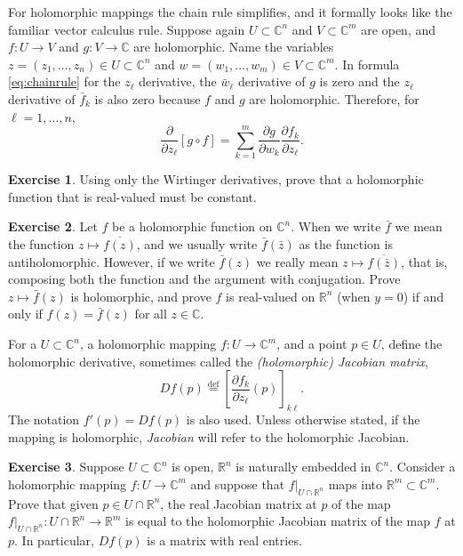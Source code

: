 \documentclass[12pt,openany]{book}
\newcommand{\C}{{\mathbb{C}}}
\newcommand{\R}{{\mathbb{R}}}
\newcommand{\myindex}[1]{#1\index{#1}}
\theoremstyle{plain}
\theoremstyle{remark}
\theoremstyle{definition}
\newenvironment{exbox}{%
    \def\FrameCommand{\vrule width 1pt \relax\hspace{10pt}}%
    \MakeFramed{\advance\hsize-\width\FrameRestore}%
}{%
    \endMakeFramed
}
\theoremstyle{exercise}
\newtheorem{exercise}{Exercise}[section]
\theoremstyle{example}
\begin{document}
For holomorphic mappings the chain rule simplifies, and it formally looks
like the familiar vector calculus rule.
Suppose again
$U \subset \C^n$ and $V \subset \C^m$ are open, and
$f \colon U \to V$ and $g \colon V \to \C$ are holomorphic.
Name the variables
$z = (z_1,\ldots,z_n) \in U \subset \C^n$ and $w = (w_1,\ldots,w_m) \in V
\subset \C^m$.  In formula \eqref{eq:chainrule} for the $z_\ell$ derivative,
the $\bar{w}_\ell$ derivative of $g$ is zero and the $z_\ell$ derivative of
$\bar{f}_k$ is also zero because $f$ and $g$ are holomorphic.
Therefore, for $\ell=1,\ldots,n$,
\begin{equation*}
\frac{\partial}{\partial z_\ell} \left[ g \circ f \right]
=
\sum_{k=1}^m
\frac{\partial g}{\partial w_k}
\frac{\partial f_k}{\partial z_\ell} .
\end{equation*}

\begin{exbox}
\begin{exercise}
Using only the Wirtinger derivatives, prove that a holomorphic function
that is real-valued must be constant.
\end{exercise}

\begin{exercise}
Let $f$ be a holomorphic function on $\C^n$.
When we write $\bar{f}$ we mean the function $z \mapsto \overline{f(z)}$,
and we usually write $\bar{f}(\bar{z})$ as the function is antiholomorphic.
However,
if we write $\bar{f}(z)$ we really mean $z \mapsto \overline{f(\bar{z})}$,
that is, composing both the function and the argument with conjugation.
Prove $z \mapsto \bar{f}(z)$ is holomorphic, and prove $f$ is
real-valued on $\R^n$ (when $y=0$) if and only if $f(z) =
\bar{f}(z)$ for all $z \in \C$.
\end{exercise}
\end{exbox}

For a $U \subset \C^n$, a holomorphic mapping $f \colon U \to \C^m$,
and a point $p \in U$,
define the holomorphic derivative, sometimes called the
\emph{(holomorphic) \myindex{Jacobian matrix}},
%
\begin{equation*}
Df(p)
\overset{\text{def}}{=}
\left[
\frac{\partial f_k}{\partial z_\ell} (p)
\right]_{k \ell} .
\end{equation*}
The notation $f'(p) = Df(p)$ is also used.
Unless otherwise stated, if the mapping is holomorphic,
\emph{Jacobian} will refer to the holomorphic Jacobian.

\begin{exbox}
\begin{exercise}
Suppose $U \subset \C^n$ is open, $\R^n$ is naturally embedded in $\C^n$.
Consider a holomorphic mapping $f \colon U \to \C^m$ and suppose that
$f|_{U \cap \R^n}$ maps into $\R^m \subset \C^m$.  Prove that given
$p \in U \cap \R^n$, the real
Jacobian matrix at $p$ of the map
$f|_{U \cap \R^n} \colon U \cap \R^n \to \R^m$ is equal to the holomorphic
Jacobian matrix of the map $f$ at $p$.  In particular, $Df(p)$ is a matrix
with real entries.
\end{exercise}
\end{exbox}
\end{document}
